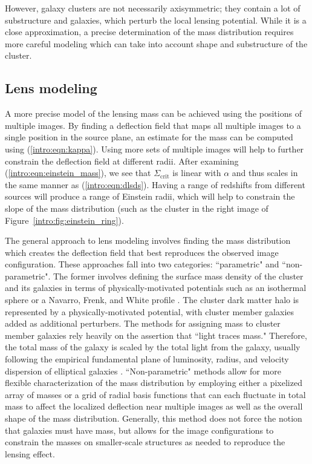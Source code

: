 However, galaxy clusters are not necessarily axisymmetric; they contain a lot of substructure and galaxies, which perturb the local lensing potential. While it is a close approximation, a precise determination of the mass distribution requires more careful modeling which can take into account shape and substructure of the cluster.

\subsection{Lens modeling}

A more precise model of the lensing mass can be achieved using the positions of multiple images. By finding a deflection field that maps all multiple images to a single position in the source plane, an estimate for the mass can be computed using (\ref{intro:eqn:kappa}). Using more sets of multiple images will help to further constrain the deflection field at different radii. After examining (\ref{intro:eqn:einstein_mass}), we see that $\Sigma_\mathrm{crit}$ is linear with $\alpha$ and thus scales in the same manner as (\ref{intro:eqn:dlsds}). Having a range of redshifts from different sources will produce a range of Einstein radii, which will help to constrain the slope of the mass distribution (such as the cluster in the right image of Figure~\ref{intro:fig:einstein_ring}).

The general approach to lens modeling involves finding the mass distribution which creates the deflection field that best reproduces the observed image configuration. These approaches fall into two categories: ``parametric" and ``non-parametric". The former involves defining the surface mass density of the cluster and its galaxies in terms of physically-motivated potentials such as an isothermal sphere or a Navarro, Frenk, and White profile \citep[NFW; ][]{Navarro:1997qa}. The cluster dark matter halo is represented by a physically-motivated potential, with cluster member galaxies added as additional perturbers. The methods for assigning mass to cluster member galaxies rely heavily on the assertion that ``light traces mass." Therefore, the total mass of the galaxy is scaled by the total light from the galaxy, usually following the empirical fundamental plane of luminosity, radius, and velocity dispersion of elliptical galaxies \citep{Gudehus:1973kq}. ``Non-parametric" methods allow for more flexible characterization of the mass distribution by employing either a pixelized array of masses or a grid of radial basis functions that can each fluctuate in total mass to affect the localized deflection near multiple images as well as the overall shape of the mass distribution. Generally, this method does not force the notion that galaxies must have mass, but allows for the image configurations to constrain the masses on smaller-scale structures as needed to reproduce the lensing effect.

